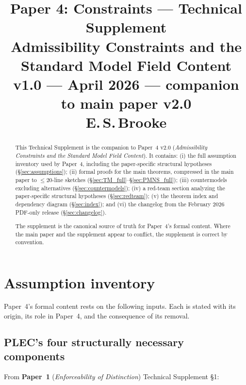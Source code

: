 \documentclass[11pt]{article}
\title{
  \textbf{Paper 4: Constraints --- Technical Supplement}\\
  \large Admissibility Constraints and the Standard Model Field Content\\
  \normalsize v1.0 --- April 2026 --- companion to main paper v2.0\\
  \normalsize E.\,S.\,Brooke
}
\author{}
\date{}
\newcommand{\paperref}[2]{\textbf{Paper~#1} (\textit{#2})}
\theoremstyle{definition}
\begin{document}
\maketitle

\begin{abstract}
\noindent
This Technical Supplement is the companion to Paper~4 v2.0 (\emph{Admissibility Constraints and the Standard Model Field Content}). It contains: (i) the full assumption inventory used by Paper~4, including the paper-specific structural hypotheses (\S\ref{sec:assumptions}); (ii) formal proofs for the main theorems, compressed in the main paper to $\leq$20-line sketches (\S\ref{sec:TM_full}--\S\ref{sec:PMNS_full}); (iii) countermodels excluding alternatives (\S\ref{sec:countermodels}); (iv) a red-team section analyzing the paper-specific structural hypotheses (\S\ref{sec:redteam}); (v) the theorem index and dependency diagram (\S\ref{sec:index}); and (vi) the changelog from the February 2026 PDF-only release (\S\ref{sec:changelog}).

The supplement is the canonical source of truth for Paper~4's formal content. Where the main paper and the supplement appear to conflict, the supplement is correct by convention.
\end{abstract}

\tableofcontents
\vspace{1em}
\clearpage

\section{Assumption inventory}\label{sec:assumptions}

Paper~4's formal content rests on the following inputs. Each is stated with its origin, its role in Paper~4, and the consequence of its removal.

\subsection{PLEC's four structurally necessary components}\label{sec:assumptions_plec}

From \paperref{1}{Enforceability of Distinction} Technical Supplement \S1:
\end{document}
